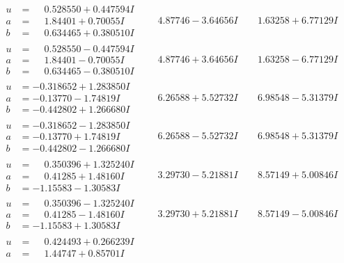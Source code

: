 \documentclass[1p]{elsarticle_modified}
\theoremstyle{definition}
\begin{document}
$$\begin{array}{c|c|c}
\begin{aligned}
u &= \phantom{-}0.528550 + 0.447594 I \\
a &= \phantom{-}1.84401 + 0.70055 I \\
b &= \phantom{-}0.634465 + 0.380510 I\end{aligned}
 & \phantom{-}4.87746 - 3.64656 I & \phantom{-}1.63258 + 6.77129 I \\ \hline\begin{aligned}
u &= \phantom{-}0.528550 - 0.447594 I \\
a &= \phantom{-}1.84401 - 0.70055 I \\
b &= \phantom{-}0.634465 - 0.380510 I\end{aligned}
 & \phantom{-}4.87746 + 3.64656 I & \phantom{-}1.63258 - 6.77129 I \\ \hline\begin{aligned}
u &= -0.318652 + 1.283850 I \\
a &= -0.13770 - 1.74819 I \\
b &= -0.442802 + 1.266680 I\end{aligned}
 & \phantom{-}6.26588 + 5.52732 I & \phantom{-}6.98548 - 5.31379 I \\ \hline\begin{aligned}
u &= -0.318652 - 1.283850 I \\
a &= -0.13770 + 1.74819 I \\
b &= -0.442802 - 1.266680 I\end{aligned}
 & \phantom{-}6.26588 - 5.52732 I & \phantom{-}6.98548 + 5.31379 I \\ \hline\begin{aligned}
u &= \phantom{-}0.350396 + 1.325240 I \\
a &= \phantom{-}0.41285 + 1.48160 I \\
b &= -1.15583 - 1.30583 I\end{aligned}
 & \phantom{-}3.29730 - 5.21881 I & \phantom{-}8.57149 + 5.00846 I \\ \hline\begin{aligned}
u &= \phantom{-}0.350396 - 1.325240 I \\
a &= \phantom{-}0.41285 - 1.48160 I \\
b &= -1.15583 + 1.30583 I\end{aligned}
 & \phantom{-}3.29730 + 5.21881 I & \phantom{-}8.57149 - 5.00846 I \\ \hline\begin{aligned}
u &= \phantom{-}0.424493 + 0.266239 I \\
a &= \phantom{-}1.44747 + 0.85701 I \\

\end{aligned}
\end{array}$$
\end{document}
